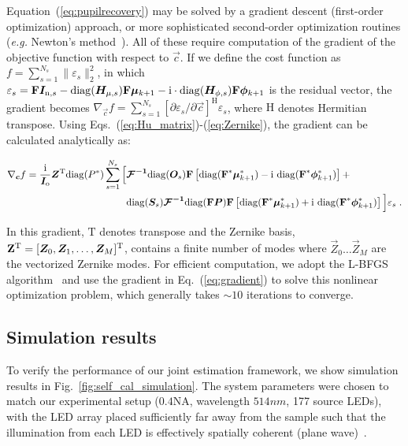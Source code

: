 \noindent Equation~({\ref{eq:pupilrecovery}}) may be solved by a gradient descent (first-order optimization) approach, or more sophisticated second-order optimization routines (\textit{e.g.} Newton's method~\cite{zhong2016nonlinear}). All of these require computation of the gradient of the objective function with respect to $\vec{c}$. If we define the cost function as $f = \sum_{s=1}^{N_{s}}\|\varepsilon_{s}\|^{2}_{2}$, in which $\varepsilon_{s} = \boldsymbol{\mathbf{F}}\bm{I}_{\mathrm{n},s}-\mathrm{diag}(\bm{H}_{\mu,s})\boldsymbol{\mathbf{F}}\bm{\mu}_{k+1}-\mathrm{i}\cdot\mathrm{diag}(\bm{H}_{\phi,s})\boldsymbol{\mathbf{F}}\bm{\phi}_{k+1}$ is the residual vector, the gradient becomes $\nabla_{\vec{c}} f =  \sum_{s=1}^{N_{s}}\left[\partial\varepsilon_{s}/\partial\vec{c}\right]^{\mathrm{H}}\varepsilon_{s}$, where $\mathrm{H}$ denotes Hermitian transpose. Using Eqs.~(\ref{eq:Hu_matrix})-(\ref{eq:Zernike}), the gradient can be calculated analytically as:

\begin{equation}
\label{eq:gradient}
\begin{split}
\nabla_{\vec{c}} f =  \frac{\mathrm{i}}{\vec{I}_{\mathrm{o}}}\boldsymbol{Z}^{\mathrm{T}}\mathrm{diag}(P^{*})\sum_{s=1}^{N_{s}} \Big[&\boldsymbol{\op{F}^{-1}}\mathrm{diag}(\vec{O}_{s})\boldsymbol{\mat{F}}\left[\mathrm{diag}(\boldsymbol{\mat{F}}^{*}\vec{\mu}^{*}_{k+1})-\mathrm{i}\ \mathrm{diag}(\boldsymbol{\mat{F}}^{*}\vec{\phi}^{*}_{k+1})\right]+\\
&\mathrm{diag}(\vec{S}_{s}) \boldsymbol{\op{F}^{-1}}\mathrm{diag}(\boldsymbol{\mat{F}}\vec{P})\boldsymbol{\mat{F}}\left[\mathrm{diag}(\boldsymbol{\mat{F}}^{*}\vec{\mu}^{*}_{k+1})+\mathrm{i}\ \mathrm{diag}(\boldsymbol{\mat{F}}^{*}\vec{\phi}^{*}_{k+1})\right]\Big]  \varepsilon_{s}\; .
\end{split}
\end{equation}

\noindent In this gradient, $\mathrm{T}$ denotes transpose and the Zernike basis, $\mathbf{Z}^{\mathrm{T}} = [\bm{Z}_{0},\bm{Z}_{1},\ldots,\bm{Z}_{M}]^{\mathrm{T}}$, contains a finite number of modes where $\vec{Z}_{0} \ldots \vec{Z}_{M}$ are the vectorized Zernike modes. For efficient computation, we adopt the L-BFGS algorithm~\cite{LBFGS} and use the gradient in Eq.~(\ref{eq:gradient}) to solve this nonlinear optimization problem, which generally takes $\sim10$ iterations to converge.

\subsection{Simulation results}
To verify the performance of our joint estimation framework, we show simulation results in Fig.~\ref{fig:self_cal_simulation}. The system parameters were chosen to match our experimental setup ($0.4 \mathrm{NA}$, wavelength $514nm$, 177 source LEDs), with the LED array placed sufficiently far away from the sample such that the illumination from each LED is effectively spatially coherent (plane wave)~\cite{Zheng2013,Ou:14,tian2015computational}.

